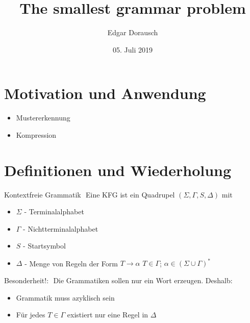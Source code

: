 \documentclass[xcolor=dvipsnames]{beamer}
\title{The smallest grammar problem}
\date{05. Juli 2019}
\author{Edgar Dorausch}
\begin{document}
\maketitle

\newcommand{\Gap}{$ $ \linebreak}
\newcommand{\FrameName}{
	\ifthenelse{\equal{\subsecname}{}}{
		\secname
	}{
		\secname \thinspace -\thinspace\subsecname
	}
}

\newcommand{\Fresh}{\ddagger}
\newcommand{\Hint}[1]{\textcolor{gray}{#1}}


\section{Motivation und Anwendung}

\begin{frame}{\FrameName}
	\begin{itemize}[<+->]
		\item Mustererkennung
		\item Kompression
	\end{itemize}
\end{frame}

\section{Definitionen und Wiederholung}
\begin{frame}{\FrameName}
	\begin{block}{Kontextfreie Grammatik}
		\Gap
		Eine KFG ist ein Quadrupel $(\Sigma,\Gamma,S,\Delta)$ mit
		\begin{itemize}
			\item $\Sigma$ - Terminalalphabet
			\item $\Gamma$ - Nichtterminalalphabet
			\item $S$ - Startsymbol
			\item $\Delta$ - Menge von Regeln der Form $T\rightarrow\alpha$\linebreak
			$T \in \Gamma$;
			$\alpha \in (\Sigma \cup \Gamma)^\ast$
		\end{itemize}
	\end{block}
	
\end{frame}

\begin{frame}{\FrameName}
\begin{alert}{Besonderheit!:}
	\Gap
	Die Grammatiken sollen nur ein Wort erzeugen. Deshalb:
	\begin{itemize}
		
		\item Grammatik muss azyklisch sein
		\item Für jedes $T \in \Gamma$ existiert nur eine Regel in $\Delta$
	\end{itemize}
\end{alert}
\end{frame}
\end{document}
